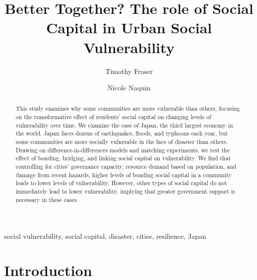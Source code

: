 \documentclass[]{elsarticle} %
\begin{document}
\begin{frontmatter}

  \title{Better Together? The role of Social Capital in Urban Social
Vulnerability}
    \author[Northeastern University]{Timothy Fraser}
    \author[Northeastern University]{Nicole Naquin}
      \address[Northeastern University]{Department of Political Science,
360 Huntington Ave, Boston, MA, 02115}
  
  \begin{abstract}
  This study examines why some communities are more vulnerable than
  others, focusing on the transformative effect of residents' social
  capital on changing levels of vulnerability over time. We examine the
  case of Japan, the third largest economy in the world. Japan faces
  dozens of earthquakes, floods, and typhoons each year, but some
  communities are more socially vulnerable in the face of disaster than
  others. Drawing on difference-in-differences models and matching
  experiments, we test the effect of bonding, bridging, and linking
  social capital on vulnerability. We find that controlling for cities'
  governance capacity, resource demand based on population, and damage
  from recent hazards, higher levels of bonding social capital in a
  community leads to lower levels of vulnerability. However, other types
  of social capital do not immediately lead to lower vulnerability,
  implying that greater government support is necessary in these cases.
  \end{abstract}
   \begin{keyword} social vulnerability, social
capital, disaster, cities, resilience, Japan\end{keyword}
 \end{frontmatter}

\captionsetup[table]{labelformat=empty}
\captionsetup[figure]{labelformat=empty}

\hypertarget{introduction}{%
\section{Introduction}\label{introduction}}
\end{document}
